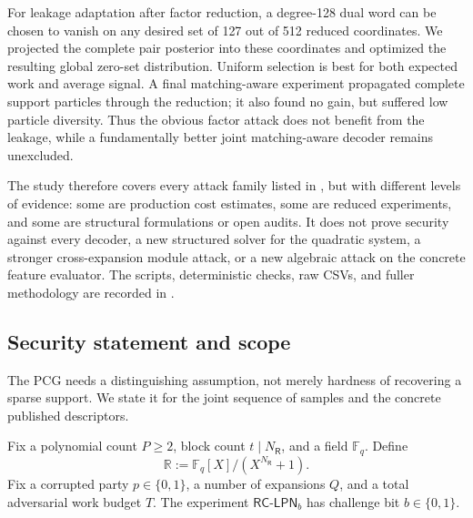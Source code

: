 For leakage adaptation after factor reduction, a degree-128 dual word can be
chosen to vanish on any desired set of 127 out of 512 reduced coordinates.
We projected the complete pair posterior into these coordinates and optimized
the resulting global zero-set distribution.  Uniform selection is best for
both expected work and average signal.  A final matching-aware experiment
propagated complete support particles through the reduction; it also found no
gain, but suffered low particle diversity.  Thus the obvious factor attack
does not benefit from the leakage, while a fundamentally better joint
matching-aware decoder remains unexcluded.

The study therefore covers every attack family listed in
, but with different levels of evidence:
some are production cost estimates, some are reduced experiments, and some are
structural formulations or open audits.  It does not prove security against
every decoder, a new structured solver for the quadratic system, a stronger
cross-expansion module attack, or a new algebraic attack on the concrete
feature evaluator.  The scripts, deterministic checks, raw CSVs, and fuller
methodology are recorded in
.

\subsection{Security statement and scope}

The PCG needs a distinguishing assumption, not merely hardness of recovering
a sparse support. We state it for the joint sequence of samples and the
concrete published descriptors.

Fix a polynomial count $P\geq2$, block count $t\mid N_{\mathsf R}$,
and a field $\mathbb F_q$. Define
\[
 \mathbb R:=\mathbb F_q[X]/(X^{N_{\mathsf R}}+1).
\]
Fix a corrupted party $p\in\{0,1\}$, a number of expansions $Q$, and
a total adversarial work budget $T$. The experiment
$\mathsf{RC\text{-}LPN}_b$ has challenge bit $b\in\{0,1\}$.


